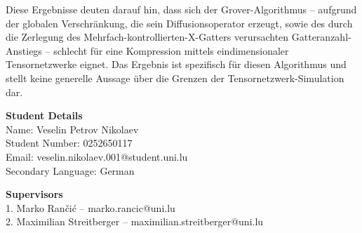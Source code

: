 \documentclass[a4paper,11pt]{article}
\begin{document}
Diese Ergebnisse deuten darauf hin, dass sich der Grover-Algorithmus -- aufgrund der globalen Verschränkung, die sein Diffusionsoperator erzeugt, sowie des durch die Zerlegung des Mehrfach-kontrollierten-X-Gatters verursachten Gatteranzahl-Anstiegs -- schlecht für eine Kompression mittels eindimensionaler Tensornetzwerke eignet. Das Ergebnis ist spezifisch für diesen Algorithmus und stellt keine generelle Aussage über die Grenzen der Tensornetzwerk-Simulation dar.

\vspace{1em}
\noindent\textbf{Student Details} \\
Name: Veselin Petrov Nikolaev \\
Student Number: 0252650117 \\
Email: veselin.nikolaev.001@student.uni.lu \\
Secondary Language: German

\vspace{1em}
\noindent\textbf{Supervisors} \\
1. Marko Rančić -- marko.rancic@uni.lu \\
2. Maximilian Streitberger -- maximilian.streitberger@uni.lu
\end{document}
